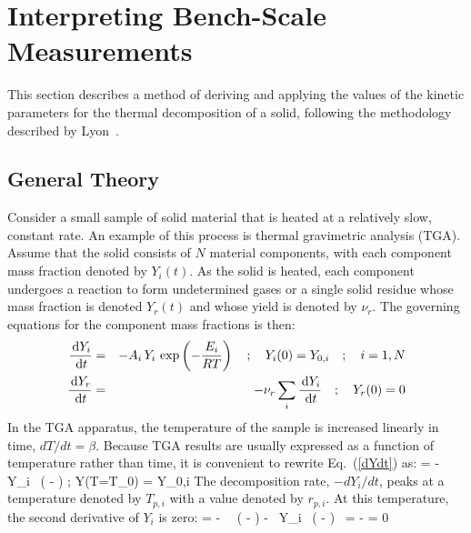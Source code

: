 \documentclass[11pt]{book}
\begin{document}
\clearpage

\section{Interpreting Bench-Scale Measurements}
\label{solid_kinetics}

This section describes a method of deriving and applying the values of the kinetic parameters for the thermal
decomposition of a solid, following the methodology described by Lyon~\cite{Lyon:FM2000}.


\subsection{General Theory}

Consider a small sample of solid material that is heated at a relatively slow, constant rate. An example of this process is
thermal gravimetric analysis (TGA). Assume that the solid consists of $N$ material components, with each component mass fraction denoted by
$Y_i(t)$. As the solid is heated, each component undergoes a reaction to form undetermined gases or a single solid residue whose
mass fraction is denoted $Y_r(t)$ and whose yield is denoted by $\nu_r$. The governing equations for the component mass fractions is then:
\begin{eqnarray}
   \frac{\,\mathrm{d} Y_i}{\,\mathrm{d} t} &=& -A_i \, Y_i \, \exp \left( -\frac{E_i}{RT} \right)    \quad ; \quad Y_i(0) = Y_{0,i} \quad ; \quad i=1,N  \label{dYdt} \\
   \frac{\,\mathrm{d} Y_r}{\,\mathrm{d} t} &=& -\nu_r  \sum_i \frac{\,\mathrm{d} Y_i}{\,\mathrm{d} t}                        \quad ; \quad Y_r(0) = 0  \label{dYrdt}
\end{eqnarray}
In the TGA apparatus, the temperature of the sample is increased linearly in time, $dT/dt=\beta$. Because TGA results are usually expressed as a function of
temperature rather than time, it is convenient to rewrite Eq.~(\ref{dYdt}) as:
\be
    = - \, Y_i \, \exp \left( - \right)    \quad ; \quad Y(T=T_0) = Y_{0,i}  \label{dYdT}
\ee
The decomposition rate, $-dY_i/dt$, peaks at a temperature denoted by $T_{p,i}$ with a value denoted by $r_{p,i}$.
At this temperature, the second derivative of $Y_i$ is zero:
\be
    = - \,  \, \exp \left( - \right) -
    \, Y_i \, \exp \left( - \right) \, 
   = -  = 0  \label{d2YdT2}
\end{document}
